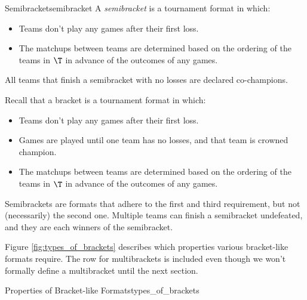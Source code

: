 {    \begin{definition}{Semibracket}{semibracket}
        A \textit{semibracket} is a tournament format in which:
        \begin{itemize}
            \item Teams don't play any games after their first loss.
            \item The matchups between teams are determined based on the ordering of the teams in $\T$ in advance of the outcomes of any games.
        \end{itemize}
        All teams that finish a semibracket with no losses are declared co-champions.
    \end{definition}

    Recall that a bracket is a tournament format in which:
    \begin{itemize}
        \item Teams don't play any games after their first loss.
        \item Games are played until one team has no losses, and that team is crowned champion.
        \item The matchups between teams are determined based on the ordering of the teams in $\T$ in advance of the outcomes of any games.
    \end{itemize}

    Semibrackets are formats that adhere to the first and third requirement, but not (necessarily) the second one. Multiple teams can finish a semibracket undefeated, and they are each winners of the semibracket.

    Figure \ref{fig:types_of_brackets} describes which properties various bracket-like formats require. The row for multibrackets is included even though we won't formally define a multibracket until the next section.

    \begin{figg}{Properties of Bracket-like Formats}{types_of_brackets}
        \begin{center}
        \end{center}
    \end{figg} 

}

